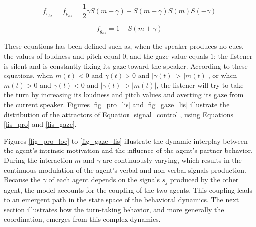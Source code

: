 \begin{equation}
f_{v_{lis}}= f_{p_{lis}} = \frac{1}{2} \gamma S(m+\gamma) + S(m+\gamma)S(m)S(-\gamma)
\label{lis_pro}
\end{equation}

\begin{equation}
f_{g_{lis}} = 1 - S(m + \gamma)
\label{lis_gaze}
\end{equation}

These equations has been defined such as, when the speaker produces no cues, the values of loudness and pitch equal $0$, and the gaze value equals $1$: the listener is silent and is constantly fixing its gaze toward the speaker. 
According to these equations, when $m(t)<0$ and $\gamma(t)>0$ and $|\gamma(t)|>|m(t)|$, or when $m(t)>0$ and $\gamma(t)<0$ and $|\gamma(t)|>|m(t)|$, the listener will try to take the turn by increasing its loudness and pitch values and averting its gaze from the current speaker. Figures \ref{fig_pro_lis} and \ref{fig_gaze_lis} illustrate the distribution of the attractors of Equation \ref{signal_control}, using Equations \ref{lis_pro} and \ref{lis_gaze}.

Figures \ref{fig_pro_loc} to \ref{fig_gaze_lis} illustrate the dynamic interplay between the agent's intrinsic motivation and the influence of the agent's partner behavior.
During the interaction $m$ and $\gamma$ are continuously varying, which results in the continuous modulation of the agent's verbal and non verbal signals production. Because the $\gamma$ of each agent depends on the signals $s_j$ produced by the other agent, the model accounts for the coupling of the two agents. This coupling leads to an emergent path in the state space of the behavioral dynamics. The next section illustrates how the turn-taking behavior, and more generally the coordination, emerges from this complex dynamics. 


